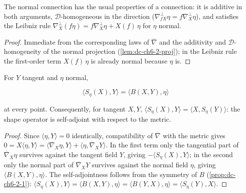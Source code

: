 \begin{proposition}
  \label{prop:dc-ch6-3-normal-connection-laws}


  The normal connection has the usual properties of a connection: it is
  additive in both arguments, $\mathcal{D}$-homogeneous in the direction
  ($\nabla^\perp_{fX}\eta=f\nabla^\perp_X\eta$), and satisfies the Leibniz rule
  $\nabla^\perp_X(f\eta)=f\nabla^\perp_X\eta+X(f)\,\eta$ for $\eta$ normal.
\end{proposition}
\begin{proof}

  \sketch
  Immediate from the corresponding laws of $\overline{\nabla}$ and the
  additivity and $\mathcal{D}$-homogeneity of the normal projection
  (\cref{lem:dc-ch6-2-proj}); in the Leibniz rule the first-order term
  $X(f)\,\eta$ is already normal because $\eta$ is.
\end{proof}

\begin{lemma}
  \label{lem:dc-ch6-3-weingarten}


  For $Y$ tangent and $\eta$ normal,

  $$
  \langle S_\eta(X),Y\rangle=\langle B(X,Y),\eta\rangle
  $$

  at every point. Consequently, for tangent $X,Y$,
  $\langle S_\eta(X),Y\rangle=\langle X,S_\eta(Y)\rangle$: the shape operator
  is self-adjoint with respect to the metric.
\end{lemma}
\begin{proof}

  \sketch
  Since $\langle\eta,Y\rangle=0$ identically, compatibility of
  $\overline{\nabla}$ with the metric gives
  $0=X\langle\eta,Y\rangle
  =\langle\overline{\nabla}_X\eta,Y\rangle+\langle\eta,\overline{\nabla}_XY\rangle$.
  In the first term only the tangential part of $\overline{\nabla}_X\eta$
  survives against the tangent field $Y$, giving $-\langle S_\eta(X),Y\rangle$;
  in the second only the normal part of $\overline{\nabla}_XY$ survives against
  the normal field $\eta$, giving $\langle B(X,Y),\eta\rangle$. The
  self-adjointness follows from the symmetry of $B$
  (\cref{prop:dc-ch6-2-1}):
  $\langle S_\eta(X),Y\rangle=\langle B(X,Y),\eta\rangle
  =\langle B(Y,X),\eta\rangle=\langle S_\eta(Y),X\rangle$.
\end{proof}

